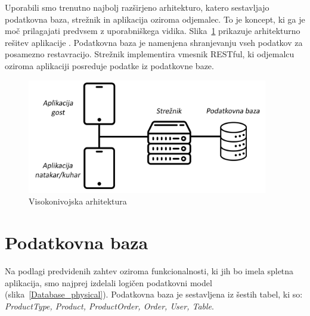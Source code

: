 \documentclass[a4paper, 12pt]{book}
\begin{document}
Uporabili smo trenutno najbolj razširjeno arhitekturo, katero sestavljajo podatkovna baza, strežnik in aplikacija oziroma odjemalec. To je koncept, ki ga je moč prilagajati predvsem z uporabniškega vidika. Slika~\ref{StrukApk} prikazuje arhitekturno rešitev aplikacije \cite{TRINIVO}.
Podatkovna baza je namenjena shranjevanju vseh podatkov za posamezno restavracijo. Strežnik implementira vmesnik RESTful, ki odjemalcu oziroma aplikaciji posreduje podatke iz podatkovne baze. 

\begin{figure}[!htb]
\centering
\includegraphics[width=10.5cm]{Skica1-new.png}
\caption{Visokonivojska arhitektura}
\label{StrukApk}
\end{figure}


\section{Podatkovna baza}
Na podlagi predvidenih zahtev oziroma funkcionalnosti, ki jih bo imela spletna aplikacija, smo najprej izdelali logičen podatkovni model (slika~\ref{Database_physical}). Podatkovna baza je sestavljena iz šestih tabel, ki so: \textit{ProductType, Product, ProductOrder, Order, User, Table}. 
\end{document}

